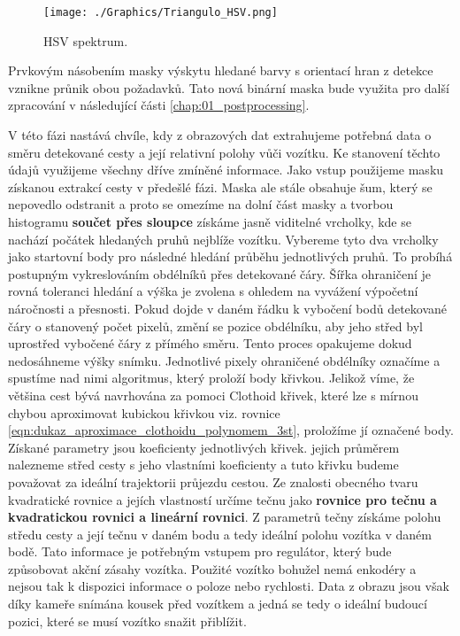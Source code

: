 \documentclass[czech, bc, kky, he, iso690alph]{fasthesis}
\begin{document}
            	\begin{figure}[ht]
            		\centering
            		\texttt{[image: ./Graphics/Triangulo\_HSV.png]}
            		\caption{HSV spektrum.}
            		\label{pic:HSV_spektrum}
            	\end{figure}
            	
            	Prvkovým násobením masky výskytu hledané barvy s orientací hran z detekce vznikne průnik obou požadavků. Tato nová binární maska bude využita pro další zpracování v následující části \ref{chap:01_postprocessing}.
            	
            	
                V této fázi nastává chvíle, kdy z obrazových dat extrahujeme potřebná data o směru detekované cesty a její relativní polohy vůči vozítku. Ke stanovení těchto údajů využijeme všechny dříve zmíněné informace. Jako vstup použijeme masku získanou extrakcí cesty v předešlé fázi. Maska ale stále obsahuje šum, který se nepovedlo odstranit a proto se omezíme na dolní část masky a tvorbou histogramu \textbf{součet přes sloupce} získáme jasně viditelné vrcholky, kde se nachází počátek hledaných pruhů nejblíže vozítku. Vybereme tyto dva vrcholky jako startovní body pro následné hledání průběhu jednotlivých pruhů. To probíhá postupným vykreslováním obdélníků přes detekované čáry. Šířka ohraničení je rovná toleranci hledání a výška je zvolena s ohledem na vyvážení výpočetní náročnosti a přesnosti. Pokud dojde v daném řádku k vybočení bodů detekované čáry o stanovený počet pixelů, změní se pozice obdélníku, aby jeho střed byl uprostřed vybočené čáry z přímého směru. Tento proces opakujeme dokud nedosáhneme výšky snímku. Jednotlivé pixely ohraničené obdélníky označíme a spustíme nad nimi algoritmus, který proloží body křivkou. Jelikož víme, že většina cest bývá navrhována za pomoci Clothoid křivek, které lze s mírnou chybou aproximovat kubickou křivkou viz. rovnice \ref{eqn:dukaz_aproximace_clothoidu_polynomem_3st}, proložíme jí označené body. Získané parametry jsou koeficienty jednotlivých křivek. jejich průměrem nalezneme střed cesty s jeho vlastními koeficienty a tuto křivku budeme považovat za ideální trajektorii průjezdu cestou. Ze znalosti obecného tvaru kvadratické rovnice a jejích vlastností určíme tečnu jako \textbf{rovnice pro tečnu a kvadratickou rovnici a lineární rovnici}. Z parametrů tečny získáme polohu středu cesty a její tečnu v daném bodu a tedy ideální polohu vozítka v daném bodě. Tato informace je potřebným vstupem pro regulátor, který bude způsobovat akční zásahy vozítka. Použité vozítko bohužel nemá enkodéry a nejsou tak k dispozici informace o poloze nebo rychlosti. Data z obrazu jsou však díky kameře snímána kousek před vozítkem a jedná se tedy o ideální budoucí pozici, které se musí vozítko snažit přiblížit.
\end{document}
